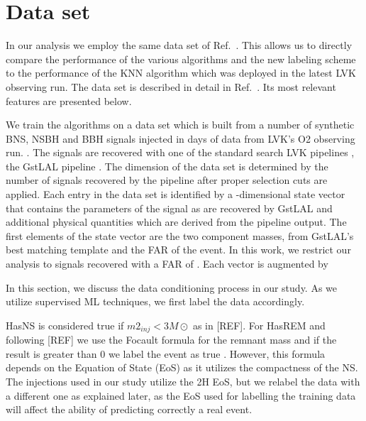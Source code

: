 \section{Data set\label{dataset}}
\label{sec:dataset}

In our analysis we employ the same data set of Ref.\ . This allows us to directly compare the performance of the various algorithms and the new labeling
scheme to the performance of the \ac{KNN} algorithm which was deployed in the latest \ac{LVK} observing run. The data set is described in detail in Ref.\ . Its most relevant features are presented below.

We train the algorithms on a data set which is built from a number of synthetic \ac{BNS}, \ac{NSBH} and \ac{BBH} signals injected in  days of data from \ac{LVK}'s
\ac{O2} observing run. . The signals are recovered with one of the standard search \ac{LVK} pipelines , the GstLAL pipeline .  The dimension of the data set is determined by the
number of signals recovered by the pipeline after proper selection cuts are applied. Each entry  in the data set is identified by a
-dimensional state vector that contains the parameters of the signal as are recovered by GstLAL and additional physical quantities which are derived from the pipeline
output. The first  elements of the state vector are the two component masses,  from GstLAL's best matching template and the \ac{FAR} of the event. In this work, we restrict our analysis to signals recovered with a \ac{FAR} of .  Each vector is augmented by  



In this section, we discuss the data conditioning process in our study.  As we utilize supervised ML techniques, we first label the data accordingly.

HasNS is considered true if $m2_{inj}< 3M\odot$ as in [REF]. For HasREM and following [REF] we use the Focault formula for the remnant mass and if the result is greater than 0 we label the event as true . However, this formula depends on the Equation of State (EoS) as it utilizes the compactness of the NS. The injections used in our study utilize the 2H EoS, but we relabel the data with a different one as explained later, as the EoS used for labelling the training data will affect the ability of predicting correctly a real event.

